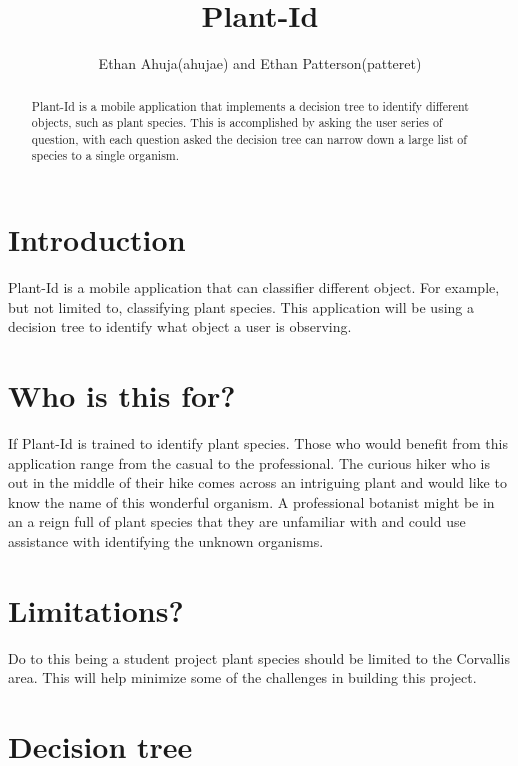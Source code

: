 \documentclass[a4paper]{article}
\title{Plant-Id}
\author{Ethan Ahuja(ahujae) and Ethan Patterson(patteret)}
\begin{document}
\maketitle

\begin{abstract}
Plant-Id is a mobile application that implements a decision tree to identify different objects, such as plant species. This is accomplished by asking the user series of question, with each question asked the decision tree can narrow down a large list of species to a single organism.
\end{abstract}
\section{Introduction}
Plant-Id is a mobile application that can classifier different object. For example, but not limited to, classifying plant species. This application will be using a decision tree to identify what object a user is observing.
\section{Who is this for?}
If Plant-Id is trained to identify plant species. Those who would benefit from this application range from the casual to the professional. The curious hiker who is out in the middle of their hike comes across an intriguing plant and would like to know the name of this wonderful organism. A professional botanist might be in an a reign full of plant species that they are unfamiliar with and could use assistance with identifying the unknown organisms. 
\section{Limitations?}
Do to this being a student project plant species should be limited to the Corvallis area. This will help minimize some of the challenges in building this project. 
\section{Decision tree}
\end{document}
